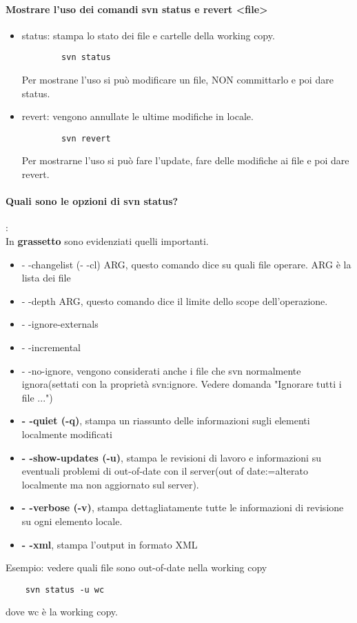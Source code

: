 \documentclass[a4paper]{article}
\begin{document}
	\paragraph{Mostrare l'uso dei comandi svn status e revert <file>}
	\begin{itemize}
		\item status: stampa lo stato dei file e cartelle della working copy.
		\begin{verbatim}
		svn status
		\end{verbatim}
		Per mostrane l'uso si può modificare un file, NON committarlo e poi dare status.
		\item revert: vengono annullate le ultime modifiche in locale.
		\begin{verbatim}
		svn revert
		\end{verbatim}
		Per mostrarne l'uso si può fare l'update, fare delle modifiche ai file e poi dare revert.
	\end{itemize}
	\paragraph{Quali sono le opzioni di svn status?}: \\
	In \textbf{grassetto} sono evidenziati quelli importanti.
	\begin{itemize}
		
		
		\item - -changelist (- -cl) ARG, questo comando dice su quali file operare. ARG è la lista dei file
		\item - -depth ARG, questo comando dice il limite dello scope dell'operazione.
		\item - -ignore-externals
		\item - -incremental
		\item - -no-ignore, vengono considerati anche i file che svn normalmente ignora(settati con la proprietà svn:ignore. Vedere domanda "Ignorare tutti i file ...")
		\item \textbf{- -quiet (-q)}, stampa un riassunto delle informazioni sugli elementi localmente modificati
		\item \textbf{- -show-updates (-u)}, stampa le revisioni di lavoro e informazioni su eventuali problemi di out-of-date con il server(out of date:=alterato localmente ma non aggiornato sul server).
		\item \textbf{- -verbose (-v)}, stampa dettagliatamente tutte le informazioni di revisione su ogni elemento locale.
		\item \textbf{- -xml}, stampa l'output in formato XML 
		
	\end{itemize}
	Esempio: vedere quali file sono out-of-date nella working copy
	\begin{verbatim}
	svn status -u wc
	\end{verbatim}
	dove wc è la working copy.
\end{document}
